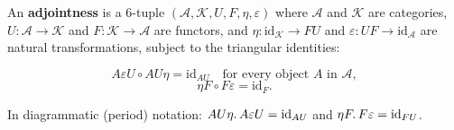 An \textbf{adjointness} is a 6-tuple $(\mathcal{A}, \mathcal{K}, U, F, \eta, \varepsilon)$ where $\mathcal{A}$ and $\mathcal{K}$ are categories, $U: \mathcal{A} \longrightarrow \mathcal{K}$ and $F: \mathcal{K} \longrightarrow \mathcal{A}$ are functors, and $\eta: \text{id}_{\mathcal{K}} \longrightarrow FU$ and $\varepsilon: UF \longrightarrow \text{id}_{\mathcal{A}}$ are natural transformations, subject to the triangular identities:

$$
A\varepsilon U \circ AU\eta = \text{id}_{AU} \quad \text{for every object } A \text{ in } \mathcal{A},
$$
$$
\eta F \circ F\varepsilon = \text{id}_{F}.
$$

In diagrammatic (period) notation: $AU\eta \ldotp A\varepsilon U = \text{id}_{AU}$ and $\eta F \ldotp F\varepsilon = \text{id}_{FU}$.
